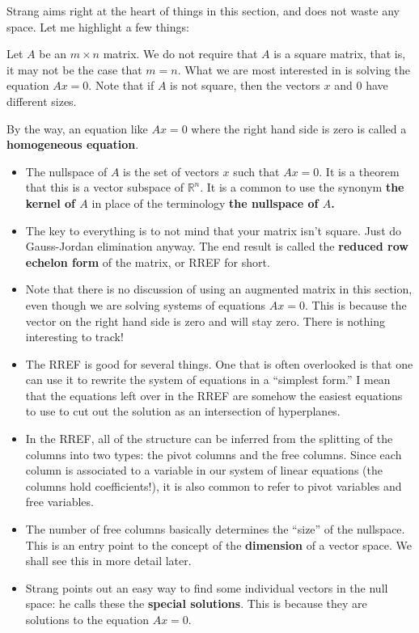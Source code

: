 \documentclass[10pt,]{book}
\newcommand{\terminology}[1]{\textbf{#1}}
\theoremstyle{plain}
\numberwithin{equation}{section}
\begin{document}
      Strang aims right at the heart of things in this section, and does not
      waste any space. Let me highlight a few things:
\par

      Let \(A\) be an \(m\times n\) matrix. We do not require that \(A\) is a square
      matrix, that is, it may not be the case that \(m=n\). What we are most
      interested in is solving the equation \(Ax = 0\). Note that if \(A\) is not
      square, then the vectors \(x\) and \(0\) have different sizes.
\par

      By the way, an equation like \(Ax=0\) where the right hand side is zero
      is called a \terminology{homogeneous equation}.
\begin{itemize}
\item{}The nullspace of \(A\) is the set of vectors \(x\) such that \(Ax=0\). It
        is a theorem that this is a vector subspace of \(\mathbb{R}^n\). It is a
        common to use the synonym \terminology{the kernel of \(A\)} in place of the
        terminology \terminology{the nullspace of \(A\).}
      \item{}The key to everything is to not mind that your matrix isn't square.
        Just do Gauss-Jordan elimination anyway. The end result is called the
        \terminology{reduced row echelon form} of the matrix, or RREF for short.
      \item{}Note that there is no discussion of using an augmented matrix in this
        section, even though we are solving systems of equations \(Ax=0\). This
        is because the vector on the right hand side is zero and will stay
        zero. There is nothing interesting to track!
      \item{}The RREF is good for several things. One that is often overlooked is
        that one can use it to rewrite the system of equations in a ``simplest
        form.'' I mean that the equations left over in the RREF are somehow
        the easiest equations to use to cut out the solution as an intersection
        of hyperplanes.
      \item{}In the RREF, all of the structure can be inferred from the splitting
        of the columns into two types: the pivot columns and the free columns.
        Since each column is associated to a variable in our system of linear
        equations (the columns hold coefficients!), it is also common to refer
        to pivot variables and free variables.
      \item{}The number of free columns basically determines the ``size'' of the
        nullspace. This is an entry point to the concept of the
        \terminology{dimension} of a vector space. We shall see this in more detail
        later.
      \item{}Strang points out an easy way to find some individual vectors in the
        null space: he calls these the \terminology{special solutions}. This is
        because they are solutions to the equation \(Ax=0\).
      \end{itemize}
\typeout{************************************************}
\typeout{************************************************}
\end{document}
